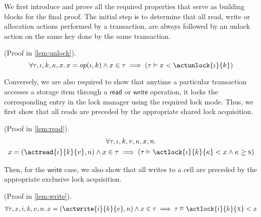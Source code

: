We first introduce and prove all the required properties that serve as building blocks for the final proof. The initial step is to determine that all read, write or allocation actions performed by a transaction, are always followed by an unlock action on the same key done by the same transaction.

\begin{lem}
	\label{prop:unlock}
	(Proof in \ref{lem:unlock}).
	\[
		\forall \tau, \iota, k, \kappa, x \ldotp
		x = op(\iota, k) \land x \in \tau \implies \left( \tau \vDash x < \actunlock{\iota}{k} \right)
	\]
\end{lem}

Conversely, we are also required to show that anytime a particular transaction accesses a storage item through a $\mathsf{read}$ or $\mathsf{write}$ operation, it locks the corresponding entry in the lock manager using the required lock mode. Thus, we first show that all reads are preceded by the appropriate shared lock acquisition.
\begin{lem}
	\label{prop:read}
	(Proof in \ref{lem:read}).
	\begin{gather*}
		\forall \tau, \iota, k, v, \kappa, x, n \ldotp \\
		x = (\actread{\iota}{k}{v}, n) \land x \in \tau \implies \left( \tau \vDash \actlock{\iota}{k}{\kappa} < x \land \kappa \geq \textsc{s} \right)
	\end{gather*}
\end{lem}

Then, for the $\mathsf{write}$ case, we also show that all writes to a cell are preceded by the appropriate exclusive lock acquisition.
\begin{lem}
	\label{prop:write}
	(Proof in \ref{lem:write}).
	\begin{gather*}
		\forall \tau, x, i, k, v, n \ldotp
		x = (\actwrite{i}{k}{v}, n) \land x \in \tau \implies
		\tau \vDash \actlock{i}{k}{\textsc{x}} < x
	\end{gather*}
\end{lem}

